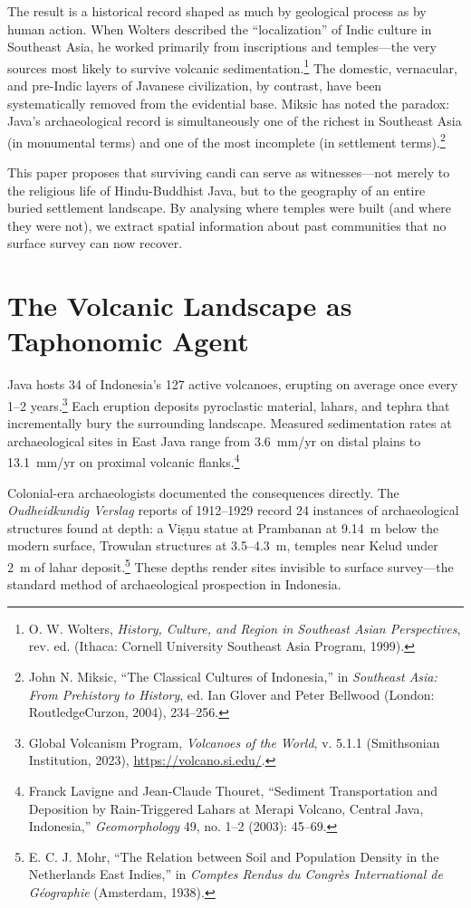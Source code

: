 \documentclass[12pt,a4paper]{article}
\begin{document}
The result is a historical record shaped as much by geological process as by human action. When Wolters described the ``localization'' of Indic culture in Southeast Asia, he worked primarily from inscriptions and temples---the very sources most likely to survive volcanic sedimentation.\footnote{O. W. Wolters, \emph{History, Culture, and Region in Southeast Asian Perspectives}, rev. ed. (Ithaca: Cornell University Southeast Asia Program, 1999).} The domestic, vernacular, and pre-Indic layers of Javanese civilization, by contrast, have been systematically removed from the evidential base. Miksic has noted the paradox: Java's archaeological record is simultaneously one of the richest in Southeast Asia (in monumental terms) and one of the most incomplete (in settlement terms).\footnote{John N. Miksic, ``The Classical Cultures of Indonesia,'' in \emph{Southeast Asia: From Prehistory to History}, ed. Ian Glover and Peter Bellwood (London: RoutledgeCurzon, 2004), 234--256.}

This paper proposes that surviving candi can serve as witnesses---not merely to the religious life of Hindu-Buddhist Java, but to the geography of an entire buried settlement landscape. By analysing where temples were built (and where they were not), we extract spatial information about past communities that no surface survey can now recover.

\section{The Volcanic Landscape as Taphonomic Agent}

Java hosts 34 of Indonesia's 127 active volcanoes, erupting on average once every 1--2 years.\footnote{Global Volcanism Program, \emph{Volcanoes of the World}, v. 5.1.1 (Smithsonian Institution, 2023), \url{https://volcano.si.edu/}.} Each eruption deposits pyroclastic material, lahars, and tephra that incrementally bury the surrounding landscape. Measured sedimentation rates at archaeological sites in East Java range from 3.6~mm/yr on distal plains to 13.1~mm/yr on proximal volcanic flanks.\footnote{Franck Lavigne and Jean-Claude Thouret, ``Sediment Transportation and Deposition by Rain-Triggered Lahars at Merapi Volcano, Central Java, Indonesia,'' \emph{Geomorphology} 49, no. 1--2 (2003): 45--69.}

Colonial-era archaeologists documented the consequences directly. The \emph{Oudheidkundig Verslag} reports of 1912--1929 record 24 instances of archaeological structures found at depth: a Vi\d{s}\d{n}u statue at Prambanan at 9.14~m below the modern surface, Trowulan structures at 3.5--4.3~m, temples near Kelud under 2~m of lahar deposit.\footnote{E. C. J. Mohr, ``The Relation between Soil and Population Density in the Netherlands East Indies,'' in \emph{Comptes Rendus du Congr\`{e}s International de G\'{e}ographie} (Amsterdam, 1938).} These depths render sites invisible to surface survey---the standard method of archaeological prospection in Indonesia.
\end{document}
